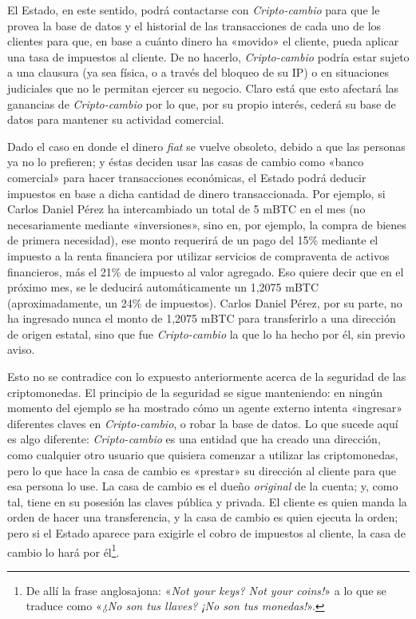 \documentclass[12pt,a4paper,twoside]{book}
\begin{document}
El Estado, en este sentido, podrá contactarse con \textit{Cripto-cambio} para que le provea la base de datos y el historial de las transacciones de cada uno de los clientes para que, en base a cuánto dinero ha «movido» el cliente, pueda aplicar una tasa de impuestos al cliente. De no hacerlo, \textit{Cripto-cambio} podría estar sujeto a una clausura (ya sea física, o a través del bloqueo de su IP) o en situaciones judiciales que no le permitan ejercer su negocio. Claro está que esto afectará las ganancias de \textit{Cripto-cambio} por lo que, por su propio interés, cederá su base de datos para mantener su actividad comercial.

Dado el caso en donde el dinero \textit{fiat} se vuelve obsoleto, debido a que las personas ya no lo prefieren; y éstas deciden usar las casas de cambio como «banco comercial» para hacer transacciones económicas, el Estado podrá deducir impuestos en base a dicha cantidad de dinero transaccionada. Por ejemplo, si Carlos Daniel Pérez ha intercambiado un total de 5 mBTC en el mes (no necesariamente mediante «inversiones», sino en, por ejemplo, la compra de bienes de primera necesidad), ese monto requerirá de un pago del 15\% mediante el impuesto a la renta financiera por utilizar servicios de compraventa de activos financieros, más el 21\% de impuesto al valor agregado. Eso quiere decir que en el próximo mes, se le deducirá automáticamente un 1,2075 mBTC (aproximadamente, un 24\% de impuestos). Carlos Daniel Pérez, por su parte, no ha ingresado nunca el monto de 1,2075 mBTC para transferirlo a una dirección de origen estatal, sino que fue \textit{Cripto-cambio} la que lo ha hecho por él, sin previo aviso.

Esto no se contradice con lo expuesto anteriormente acerca de la seguridad de las criptomonedas. El principio de la seguridad se sigue manteniendo: en ningún momento del ejemplo se ha mostrado cómo un agente externo intenta «ingresar» diferentes claves en \textit{Cripto-cambio}, o robar la base de datos. Lo que sucede aquí es algo diferente: \textit{Cripto-cambio} es una entidad que ha creado una dirección, como cualquier otro usuario que quisiera comenzar a utilizar las criptomonedas, pero lo que hace la casa de cambio es «prestar» su dirección al cliente para que esa persona lo use. La casa de cambio es el dueño \textit{original} de la cuenta; y, como tal, tiene en su posesión las claves pública y privada. El cliente es quien manda la orden de hacer una transferencia, y la casa de cambio es quien ejecuta la orden; pero si el Estado aparece para exigirle el cobro de impuestos al cliente, la casa de cambio lo hará por él\footnote{De allí la frase anglosajona: «\textit{Not your keys? Not your coins!}» a lo que se traduce como «\textit{¿No son tus llaves? ¡No son tus monedas!}».}.
\end{document}
